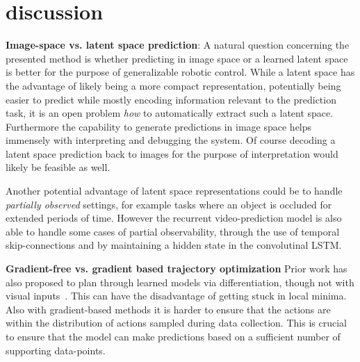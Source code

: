 \section{discussion}
\textbf{Image-space vs. latent space prediction}: A natural question concerning the presented method is whether predicting in image space or a learned latent space is better for the purpose of generalizable robotic control. While a latent space has the advantage of likely being a more compact representation, potentially being easier to predict while mostly encoding information relevant to the prediction task, it is an open problem \emph{how} to automatically extract such a latent space. Furthermore the capability to generate predictions in image space helps immensely with interpreting and debugging the system. Of course decoding a latent space prediction back to images for the purpose of interpretation would likely be feasible as well. 

Another potential advantage of latent space representations could be to handle \emph{partially observed} settings, for example tasks where an object is occluded for extended periods of time. However the recurrent video-prediction model is also able to handle some cases of partial observability, through the use of temporal skip-connections and by maintaining a hidden state in the convolutinal LSTM.

\textbf{Gradient-free vs. gradient based trajectory optimization} Prior work has also proposed to plan through learned models via differentiation, though not with visual inputs~\cite{deep_mpc}. This can have the disadvantage of getting stuck in local minima. Also with gradient-based methods it is harder to ensure that the actions are within the distribution of actions sampled during data collection. This is crucial to ensure that the model can make predictions based on a sufficient number of supporting data-points.